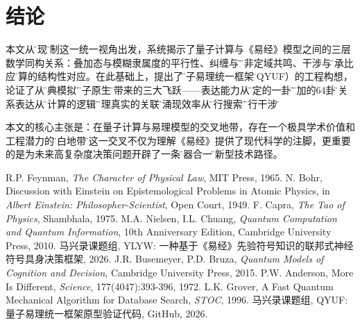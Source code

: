 \documentclass[twocolumn]{article}
\begin{document}
\section{结论}

本文从\"涌现\"机制这一统一视角出发，系统揭示了量子计算与《易经》模型之间的三层数学同构关系：叠加态与模糊隶属度的平行性、纠缠与\"应\"的非定域共鸣、干涉与\"乘承比应\"运算的结构性对应。在此基础上，提出了\"量子易理统一框架\"（QYUF）的工程构想，论证了从\"经典模拟\"到\"量子原生\"将带来的三大飞跃——表达能力从\"确定的一卦\"到\"叠加的64卦\"、关系表达从\"被计算的逻辑\"到\"物理真实的关联\"、涌现效率从\"串行搜索\"到\"并行干涉\"。

本文的核心主张是：在量子计算与易理模型的交叉地带，存在一个极具学术价值和工程潜力的\"空白地带\"。这一交叉不仅为理解《易经》提供了现代科学的注脚，更重要的是为未来高复杂度决策问题开辟了一条\"道器合一\"的新型技术路径。

\begin{thebibliography}{99}
   R.P. Feynman, \textit{The Character of Physical Law}, MIT Press, 1965.
   N. Bohr, Discussion with Einstein on Epistemological Problems in Atomic Physics, in \textit{Albert Einstein: Philosopher-Scientist}, Open Court, 1949.
   F. Capra, \textit{The Tao of Physics}, Shambhala, 1975.
   M.A. Nielsen, I.L. Chuang, \textit{Quantum Computation and Quantum Information}, 10th Anniversary Edition, Cambridge University Press, 2010.
   马兴录课题组, YLYW: 一种基于《易经》先验符号知识的联邦式神经符号具身决策框架, 2026.
   J.R. Busemeyer, P.D. Bruza, \textit{Quantum Models of Cognition and Decision}, Cambridge University Press, 2015.
   P.W. Anderson, More Is Different, \textit{Science}, 177(4047):393-396, 1972.
   L.K. Grover, A Fast Quantum Mechanical Algorithm for Database Search, \textit{STOC}, 1996.
 马兴录课题组, QYUF: 量子易理统一框架原型验证代码, GitHub, 2026.
\end{thebibliography}
\end{document}
